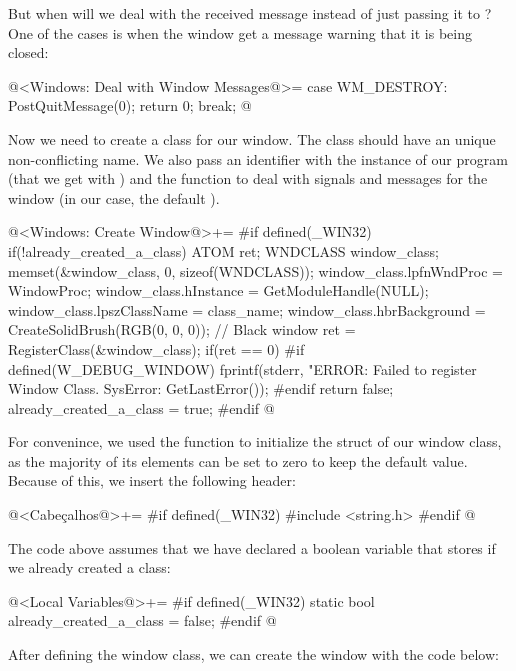 But when will we deal with the received message instead of just
passing it to ? One of the cases is when the
window get a message warning that it is being closed:

\iniciocodigo
@<Windows: Deal with Window Messages@>=
case WM_DESTROY:
  PostQuitMessage(0);
  return 0;
  break;
@
\fimcodigo

Now we need to create a class for our window. The class should have an
unique non-conflicting name. We also pass an identifier with the
instance of our program (that we get
with ) and the function to deal with
signals and messages for the window (in our case, the
default ).

\iniciocodigo
@<Windows: Create Window@>+=
#if defined(_WIN32)
if(!already_created_a_class){
  ATOM ret;
  WNDCLASS window_class;
  memset(&window_class, 0, sizeof(WNDCLASS));
  window_class.lpfnWndProc = WindowProc;
  window_class.hInstance = GetModuleHandle(NULL);
  window_class.lpszClassName = class_name;
  window_class.hbrBackground = CreateSolidBrush(RGB(0, 0, 0)); // Black window
  ret = RegisterClass(&window_class);
  if(ret == 0){
#if defined(W_DEBUG_WINDOW)
    fprintf(stderr, "ERROR: Failed to register Window Class. SysError: %
            GetLastError());
#endif
    return false;
  }
  already_created_a_class = true;
}
#endif
@
\fimcodigo

For convenince, we used the function  to initialize
the struct of our window class, as the majority of its elements can be
set to zero to keep the default value. Because of this, we insert the
following header:

\iniciocodigo
@<Cabeçalhos@>+=
#if defined(_WIN32)
#include <string.h>
#endif
@
\fimcodigo

The code above assumes that we have declared a boolean variable that
stores if we already created a class:

\iniciocodigo
@<Local Variables@>+=
#if defined(_WIN32)
static bool already_created_a_class = false;
#endif
@
\fimcodigo

After defining the window class, we can create the window with the
code below:

